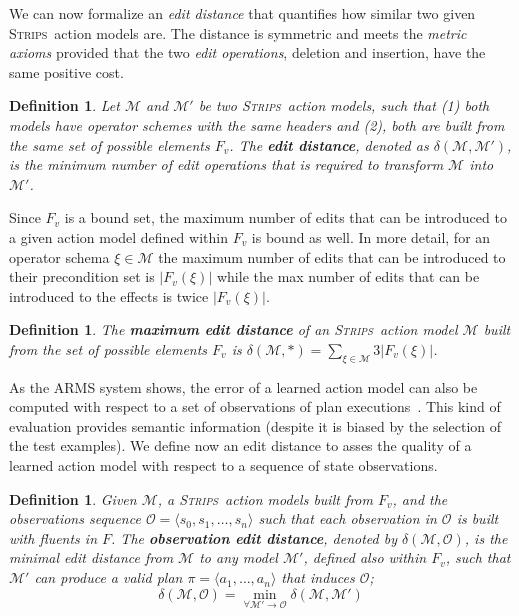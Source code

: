 \documentclass[3p,times]{elsarticle}
\newtheorem{mydefinition}[mytheorem]{Definition}
\newcommand{\strips}{\textsc{Strips}}     %
\newcommand{\tup}[1]{{\langle #1 \rangle}}
\begin{document}
We can now formalize an {\em edit distance} that quantifies how similar two given \strips\ action models are. The distance is symmetric and meets the {\em metric axioms} provided that the two {\em edit operations}, deletion and insertion, have the same positive cost.

\begin{mydefinition}
  Let $\mathcal{M}$ and $\mathcal{M}'$ be two \strips\ action models, such that (1) both models have operator schemes with the same headers and (2), both are built from the same set of possible elements $F_v$. The {\bf edit distance}, denoted as $\delta(\mathcal{M},\mathcal{M}')$, is the minimum number of {\em edit operations} that is required to transform $\mathcal{M}$ into $\mathcal{M}'$.
\end{mydefinition}

Since $F_v$ is a bound set, the maximum number of edits that can be introduced to a given action model defined within $F_v$ is bound as well. In more detail, for an operator schema $\xi\in\mathcal{M}$ the maximum number of edits that can be introduced to their precondition set is $|F_v(\xi)|$ while the max number of edits that can be introduced to the effects is twice $|F_v(\xi)|$.

\begin{mydefinition}
The \textbf{maximum edit distance} of an \strips\ action model $\mathcal{M}$ built from the set of possible elements $F_v$ is $\delta(\mathcal{M},*)=\sum_{\xi\in\mathcal{M}} 3|F_v(\xi)|$.
\end{mydefinition}

As the ARMS system shows, the error of a learned action model can also be computed with respect to a set of observations of plan executions~\cite{yang2007learning}. This kind of evaluation provides semantic information (despite it is biased by the selection of the test examples). We define now an edit distance to asses the quality of a learned action model with respect to a sequence of state observations.

\begin{mydefinition}
  Given $\mathcal{M}$, a \strips\ action models built from $F_v$, and the observations sequence $\mathcal{O}=\tup{s_0, s_1, \ldots, s_n}$ such that each observation in $\mathcal{O}$ is built with fluents in $F$. The {\bf observation edit distance}, denoted by  $\delta(\mathcal{M},\mathcal{O})$, is the minimal edit distance from $\mathcal{M}$ to any model $\mathcal{M}'$, defined also within $F_v$, such that $\mathcal{M}'$ can produce a valid plan $\pi=\tup{a_1, \ldots, a_n}$ that induces $\mathcal{O}$; \[\delta(\mathcal{M},\mathcal{O})=\min_{\forall \mathcal{M}' \rightarrow \mathcal{O}} \delta(\mathcal{M},\mathcal{M}')\]
\end{mydefinition}
\end{document}
